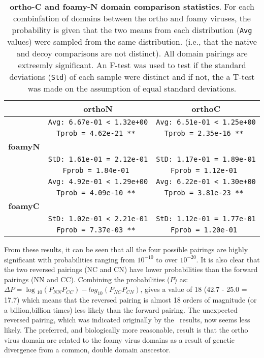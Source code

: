 \begin{table}
\centering
\begin{tabular}{c|c|c|}
             &          {\bf orthoN}           &          {\bf orthoC}           \\
\hline \hline
             & {\tt Avg: 6.67e-01 < 1.32e+00 } & {\tt Avg: 6.51e-01 < 1.25e+00 } \\
             & {\tt Tprob = 4.62e-21 **      } & {\tt Tprob = 2.35e-16 **      } \\
{\bf foamyN} &                                 &                                 \\
             & {\tt StD: 1.61e-01 = 2.12e-01 } & {\tt StD: 1.17e-01 = 1.89e-01 } \\
             & {\tt Fprob = 1.84e-01         } & {\tt Fprob = 1.12e-01         } \\
\hline
             & {\tt Avg: 4.92e-01 < 1.29e+00 } & {\tt Avg: 6.22e-01 < 1.30e+00 } \\
             & {\tt Tprob = 4.09e-10 **      } & {\tt Tprob = 3.81e-23 **      } \\
{\bf foamyC} &                                 &                                 \\
             & {\tt StD: 1.02e-01 < 2.21e-01 } & {\tt StD: 1.12e-01 = 1.77e-01 } \\
             & {\tt Fprob = 7.37e-03 **      } & {\tt Fprob = 1.20e-01         } \\
\hline \hline
\end{tabular}
\begin{footnotesize}
\caption{
\label{Tab:Zscores}
{\bf ortho-C and foamy-N domain comparison statistics}.
For each combinfation of domains between the ortho and foamy viruses, the probability
is given that the two means from each distribution ({\tt Avg} values) were sampled
from the same distribution.  (i.e., that the native and decoy comparisons are
not distinct).   All domain pairings are extreemly significant.   An F-test was used to
test if the standard deviations ({\tt Std}) of each sample were distinct and if not,
the a T-test was made on the assumption of equal standard deviations.
}
\end{footnotesize}
\end{table}

From these results, it can be seen that all the four possible pairings are
highly significant with probabilities ranging from $10^{-10}$ to over $10^{-20}$.
It is also clear that the two reversed pairings (NC and CN) have lower probabilities
than the forward pairings (NN and CC).   Combining the probabilities ($P$) as:
$\Delta P = \log{_10}(P_{NN} P_{CC}) - log_{10}(P_{NC} P_{CN})$,
gives a value of 18 (42.7 - 25.0 = 17.7) which means that the reversed pairing is almost 18
orders of magnitude (or a billion,billion times) less likely than the forward pairing.
The unexpected reversed pairing, which was indicated originally by the \DALI\ results, now seems
less likely.  The preferred, and biologically more reasonable, result is that the ortho virus
domain are related to the foamy virus domains as a result of genetic divergence from
a common, double domain anscestor. 

